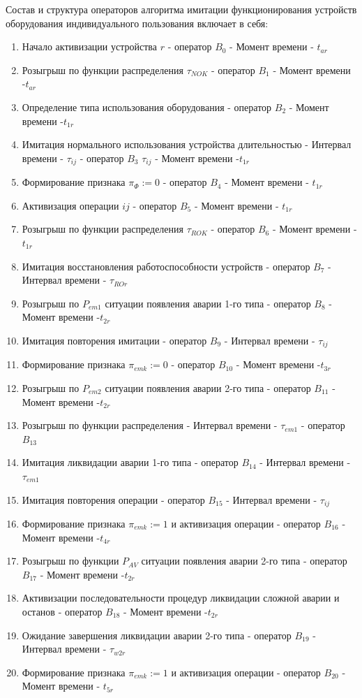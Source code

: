 Состав и структура операторов алгоритма имитации функционирования устройств оборудования индивидуального пользования включает в себя:
\begin{enumerate}
    \item Начало активизации устройства $r$ - оператор $B_0$ - Момент времени - $t_{ar}$
    \item Розыгрыш по функции распределения $\tau_{NOK}$ - оператор $B_1$ - Момент времени -$t_{ar}$
    \item Определение типа использования оборудования - оператор $B_2$ - Момент времени -$t_{1r}$
    \item Имитация нормального использования устройства длительностью - Интервал времени - $\tau_{ij}$ - оператор $B_3$ $\tau_{ij}$ - Момент времени -$t_{1r}$
    \item Формирование признака  $\pi_{\Phi}:=0$ - оператор  $B_4$ - Момент времени - $t_{1r}$
    \item Активизация операции $ij$ - оператор $B_5$ - Момент времени - $t_{1r}$
    \item Розыгрыш по функции распределения $\tau_{ROK}$ - оператор $B_6$  - Момент времени -$t_{1r}$
    \item Имитация восстановления работоспособности устройств - оператор $B_7$ - Интервал времени - $\tau_{ROr}$
    \item Розыгрыш по $P_{em1}$ ситуации появления аварии 1-го типа - оператор $B_8$ - Момент времени -$t_{2r}$
    \item Имитация повторения имитации - оператор $B_9$ - Интервал времени - $\tau_{ij}$
    \item Формирование признака $\pi_{emk}:=0 $ - оператор $B_{10}$  - Момент времени -$t_{3r}$
    \item Розыгрыш по $P_{em2}$ ситуации появления аварии 2-го типа - оператор $B_{11}$ - Момент времени -$t_{2r}$
    \item Розыгрыш по функции распределения - Интервал времени - $\tau_{em1}$ - оператор $B_{13}$
    \item Имитация ликвидации аварии 1-го типа - оператор $B_{14}$ - Интервал времени - $\tau_{em1}$
    \item Имитация повторения операции - оператор $B_{15}$ - Интервал времени - $\tau_{ij}$
    \item Формирование признака $\pi_{emk}:=1$ и активизация операции - оператор $B_{16}$ - Момент времени -$t_{4r}$
    \item Розыгрыш по функции $P_{AV}$ ситуации появления аварии 2-го типа - оператор $B_{17}$ - Момент времени -$t_{2r}$
    \item Активизации последовательности процедур ликвидации сложной аварии и останов - оператор $B_{18}$ - Момент времени -$t_{2r}$
    \item Ожидание завершения ликвидации аварии 2-го типа - оператор $B_{19}$ - Интервал времени - $\tau_{w2r}$
    \item Формирование признака $\pi_{emk}:=1$ и активизация операции - оператор $B_{20}$ - Момент времени - $t_{5r}$
\end{enumerate}

